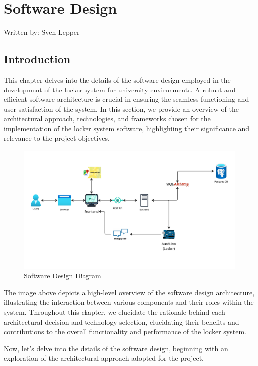 \section{Software Design}
{\tiny Written by: Sven Lepper}\\

\subsection{Introduction}
This chapter delves into the details of the software design employed in the development of the locker system for university environments. A robust and efficient software architecture is crucial in ensuring the seamless functioning and user satisfaction of the system. In this section, we provide an overview of the architectural approach, technologies, and frameworks chosen for the implementation of the locker system software, highlighting their significance and relevance to the project objectives.

\begin{figure}[h]
    \centering
    \includegraphics[width=\textwidth]{images/software_design_diagram}
    \caption{Software Design Diagram}
    \label{fig:software_design}
\end{figure}

The image above depicts a high-level overview of the software design architecture, illustrating the interaction between various components and their roles within the system. Throughout this chapter, we elucidate the rationale behind each architectural decision and technology selection, elucidating their benefits and contributions to the overall functionality and performance of the locker system.

Now, let's delve into the details of the software design, beginning with an exploration of the architectural approach adopted for the project.

